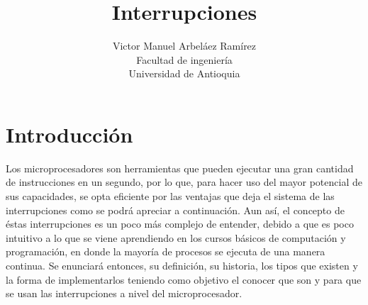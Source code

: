 \documentclass[12pt, letter]{article}
\title{\huge{Interrupciones}}
\author{Victor Manuel Arbeláez Ramírez \\ Facultad de ingeniería \\ Universidad de Antioquia}
\date{}
\begin{document}
\raggedright

\maketitle


\section*{Introducción}
Los microprocesadores son herramientas que pueden ejecutar una gran cantidad de instrucciones en un segundo, por lo que, para hacer uso del mayor potencial de sus capacidades, se opta eficiente por las ventajas que deja el sistema de las interrupciones como se podrá apreciar a continuación. Aun así, el concepto de éstas interrupciones es un poco más complejo de entender, debido a que es poco intuitivo a lo que se viene aprendiendo en los cursos básicos de computación y programación, en donde la mayoría de procesos se ejecuta de una manera continua. Se enunciará entonces, su definición, su historia, los tipos que existen y la forma de implementarlos teniendo como objetivo el conocer que son y para que se usan las interrupciones a nivel del microprocesador.
\newpage
\end{document}
